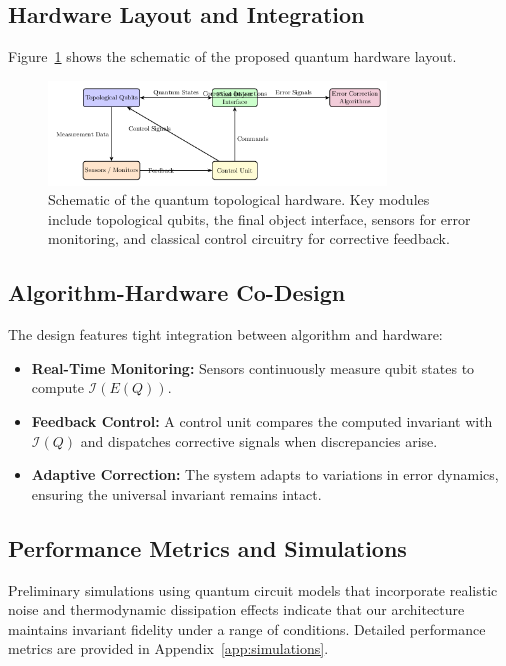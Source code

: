 \documentclass[11pt]{article}
\begin{document}
\subsection{Hardware Layout and Integration}
Figure~\ref{fig:hardware} shows the schematic of the proposed quantum hardware layout.
\begin{figure}[ht]
\centering
\includegraphics[width=0.8\textwidth]{hardware_layout.png}
\caption{Schematic of the quantum topological hardware. Key modules include topological qubits, the final object interface, sensors for error monitoring, and classical control circuitry for corrective feedback.}
\label{fig:hardware}
\end{figure}

\subsection{Algorithm-Hardware Co-Design}
The design features tight integration between algorithm and hardware:
\begin{itemize}
    \item \textbf{Real-Time Monitoring:} Sensors continuously measure qubit states to compute \(\mathcal{I}(E(Q))\).
    \item \textbf{Feedback Control:} A control unit compares the computed invariant with \(\mathcal{I}(Q)\) and dispatches corrective signals when discrepancies arise.
    \item \textbf{Adaptive Correction:} The system adapts to variations in error dynamics, ensuring the universal invariant remains intact.
\end{itemize}

\subsection{Performance Metrics and Simulations}
Preliminary simulations using quantum circuit models that incorporate realistic noise and thermodynamic dissipation effects indicate that our architecture maintains invariant fidelity under a range of conditions. Detailed performance metrics are provided in Appendix~\ref{app:simulations}.
\end{document}
